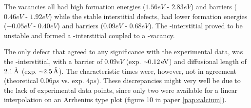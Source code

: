 The vacancies all had high formation energies ($1.56\unit{eV}$ - $2.83\unit{eV}$) and barriers ($0.46\unit{eV}$ - $1.92\unit{eV}$) while the stable interstitial defects, had lower formation energies ($-0.05\unit{eV}$ - $0.40\unit{eV}$) and barriers ($0.09\unit{eV}$ - $0.68\unit{eV}$).
The -interstitial proved to be unstable and formed a -interstitial coupled to a -vacancy.

The only defect that agreed to any significance with the experimental data, was the -interstitial, with a barrier of $0.09\unit{eV}$ (exp. $\mytilde0.12\unit{eV}$) and diffusional length of $2.1\, \mathrm{\mathring{\mathrm{A}}}$ (exp. $\mytilde2.5\unit{\mAA}$).
The characteristic times were, however, not in agreement (theoretical $0.06\unit{ps}$ vs. exp. $4\unit{ps}$).
These discrepancies might very well be due to the lack of experimental data points, since only two were available for a linear interpolation on an Arrhenius type plot (figure 10 in paper \ref{pap:calcium}).
